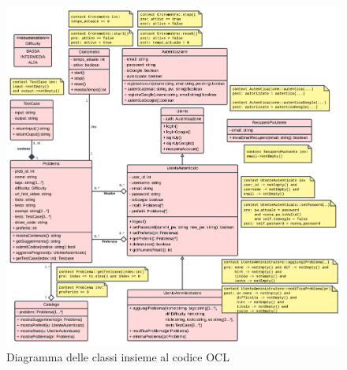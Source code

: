 \documentclass[11pt, a4paper]{article}
\theoremstyle{definition} %
\begin{document}
\begin{figure}[H]
\centering
\hspace*{-2.5cm}
\includegraphics[scale = 0.6]{materiale/classdiagram.pdf}
\caption{Diagramma delle classi insieme al codice OCL}
\label{umlocl}
\end{figure}
\end{document}
